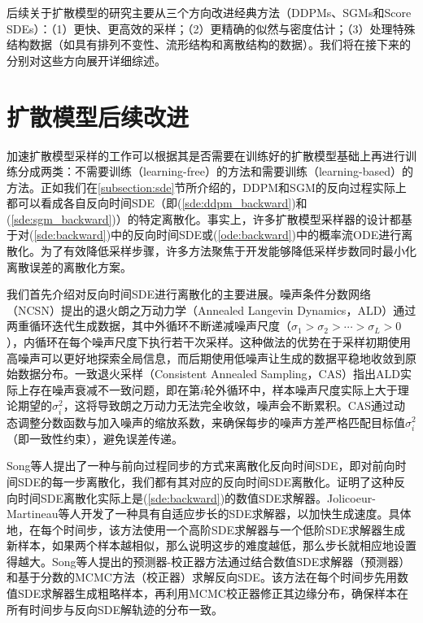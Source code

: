 \documentclass[11pt,a4paper,UTF8]{ctexart}
\begin{document}
后续关于扩散模型的研究主要从三个方向改进经典方法（DDPMs、SGMs和Score SDEs）：（1）更快、更高效的采样；（2）更精确的似然与密度估计；（3）处理特殊结构数据（如具有排列不变性、流形结构和离散结构的数据）。我们将在接下来的分别对这些方向展开详细综述。

\section{扩散模型后续改进}

加速扩散模型采样的工作可以根据其是否需要在训练好的扩散模型基础上再进行训练分成两类：不需要训练（learning-free）的方法和需要训练（learning-based）的方法。正如我们在\ref{subsection:sde}节所介绍的，DDPM和SGM的反向过程实际上都可以看成各自反向时间SDE（即(\ref{sde:ddpm_backward})和(\ref{sde:sgm_backward})）的特定离散化。事实上，许多扩散模型采样器的设计都基于对(\ref{sde:backward})中的反向时间SDE或(\ref{ode:backward})中的概率流ODE进行离散化。为了有效降低采样步骤，许多方法聚焦于开发能够降低采样步数同时最小化离散误差的离散化方案。

我们首先介绍对反向时间SDE进行离散化的主要进展。噪声条件分数网络（NCSN）\cite{song2019generative}提出的退火朗之万动力学（Annealed Langevin Dynamics，ALD）通过两重循环迭代生成数据，其中外循环不断递减噪声尺度（$\sigma_1>\sigma_2>\cdots>\sigma_L>0$），内循环在每个噪声尺度下执行若干次采样。这种做法的优势在于采样初期使用高噪声可以更好地探索全局信息，而后期使用低噪声让生成的数据平稳地收敛到原始数据分布。一致退火采样（Consistent Annealed Sampling，CAS）\cite{JolicoeurMartineau2021AdversarialSM}指出ALD实际上存在噪声衰减不一致问题，即在第$i$轮外循环中，样本噪声尺度实际上大于理论期望的$\sigma_i^2$，这将导致朗之万动力无法完全收敛，噪声会不断累积。CAS通过动态调整分数函数与加入噪声的缩放系数，来确保每步的噪声方差严格匹配目标值$\sigma_i^2$（即一致性约束），避免误差传递。


Song等人\cite{song2020score}提出了一种与前向过程同步的方式来离散化反向时间SDE，即对前向时间SDE的每一步离散化，我们都有其对应的反向时间SDE离散化。\cite{song2020score}证明了这种反向时间SDE离散化实际上是(\ref{sde:backward})的数值SDE求解器。Jolicoeur-Martineau等人\cite{jolicoeur2021gotta}开发了一种具有自适应步长的SDE求解器，以加快生成速度。具体地，在每个时间步，该方法使用一个高阶SDE求解器与一个低阶SDE求解器生成新样本，如果两个样本越相似，那么说明这步的难度越低，那么步长就相应地设置得越大。Song等人\cite{song2020score}提出的预测器-校正器方法通过结合数值SDE求解器（预测器）和基于分数的MCMC方法（校正器）求解反向SDE。该方法在每个时间步先用数值SDE求解器生成粗略样本，再利用MCMC校正器修正其边缘分布，确保样本在所有时间步与反向SDE解轨迹的分布一致。
\end{document}
